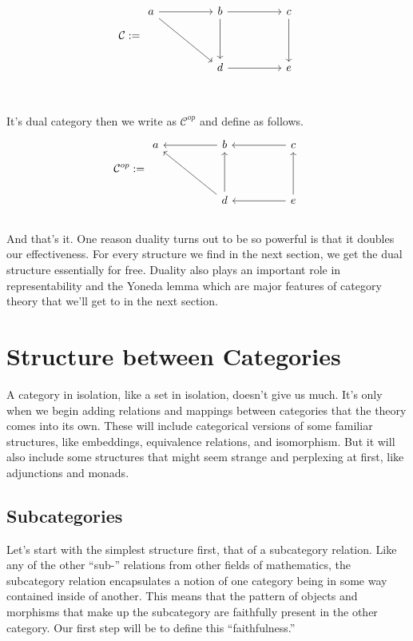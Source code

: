\documentclass[12pt]{article}
\theoremstyle{definition}
\begin{document}
\[\mathcal{C} := \begin{tikzcd}
        a && b && c \\
        \\
        && d && e
        \arrow[from=1-1, to=1-3]
        \arrow[from=1-1, to=3-3]
        \arrow[from=1-3, to=3-3]
        \arrow[from=3-3, to=3-5]
        \arrow[from=1-3, to=1-5]
        \arrow[from=1-5, to=3-5]
    \end{tikzcd}\]
\\\\It's dual category then we write as $\mathcal{C}^{op}$ and define as follows.
\[\mathcal{C}^{op} := \begin{tikzcd}
        a && b && c \\
        \\
        && d && e
        \arrow[from=1-3, to=1-1]
        \arrow[from=3-3, to=1-1]
        \arrow[from=3-3, to=1-3]
        \arrow[from=3-5, to=3-3]
        \arrow[from=1-5, to=1-3]
        \arrow[from=3-5, to=1-5]
    \end{tikzcd}\]
\\
And that's it.
One reason duality turns out to be so powerful is that it doubles our effectiveness.
For every structure we find in the next section, we get the dual structure essentially for free.
Duality also plays an important role in representability and the Yoneda lemma which are major features of category theory that we'll get to in the next section.







\pagebreak
\color{blue}
\section*{Structure between Categories}
A category in isolation, like a set in isolation, doesn't give us much.
It's only when we begin adding relations and mappings between categories that the theory comes into its own.
These will include categorical versions of some familiar structures, like embeddings, equivalence relations, and isomorphism.
But it will also include some structures that might seem strange and perplexing at first, like adjunctions and monads.


\subsection*{Subcategories}
Let's start with the simplest structure first, that of a subcategory relation.
Like any of the other ``sub-'' relations from other fields of mathematics, the subcategory relation encapsulates a notion of one category being in some way contained inside of another.
This means that the pattern of objects and morphisms that make up the subcategory are faithfully present in the other category.
Our first step will be to define this ``faithfulness.''
\end{document}
